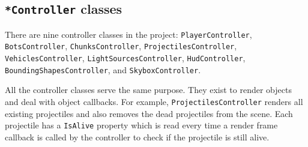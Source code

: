 \subsection{\texttt{*Controller} classes}\label{subsec:controller-classes}
There are nine controller classes in the project:
\texttt{PlayerController},
\texttt{BotsController},
\texttt{ChunksController},
\texttt{ProjectilesController},
\texttt{VehiclesController},
\texttt{LightSourcesController},
\texttt{HudController},
\texttt{BoundingShapesController}, and
\texttt{SkyboxController}.

All the controller classes serve the same purpose.
They exist to render objects and deal with object callbacks.
For example, \texttt{ProjectilesController} renders all existing projectiles and also removes the dead projectiles from the scene.
Each projectile has a \texttt{IsAlive} property which is read every time a render frame callback is called by the controller to check if the projectile is still alive.
